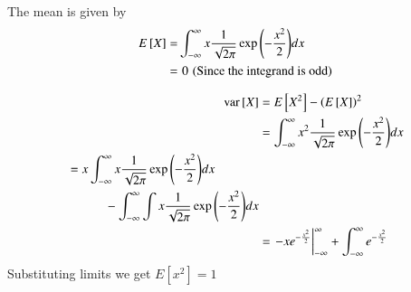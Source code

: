 \documentclass[journal,12pt,twocolumn]{IEEEtran}
\renewcommand\thesection{\arabic{section}}
\begin{document}
\begin{enumerate}[label=\thesection.\arabic*
,ref=\thesection.\theenumi]
\solution
The mean is given by
		\begin{align}
			E{}\left[X\right] =& \int_{-\infty}^{\infty}x\frac{1}{\sqrt{2\pi}}\exp{\ensuremath{\left(-\frac{x^2}{2}\right)}}dx\\
			=& \,\,0\,\,\text{(Since the integrand is odd)}
		\end{align}

		\begin{align}
			\text{var}{}\left[X\right] &= E{}\left[X^2\right] - \left(E{}\left[X\right]\right)^2 \\
			&=\int_{-\infty}^{\infty}x^2\frac{1}{\sqrt{2\pi}}\exp{\left(-\frac{x^2}{2}\right)}dx\\
			\begin{split}
			 &= x\int_{-\infty}^{\infty}x\frac{1}{\sqrt{2\pi}}\exp{\left(-\frac{x^2}{2}\right)}dx \\&\hspace{3em} -\int_{-\infty}^{\infty}\int x\frac{1}{\sqrt{2\pi}} \exp{\left(-\frac{x^2}{2}\right)}dx
			\end{split}\\
			&= \left.-xe^{-\frac{x^2}{2}}\right|_{-\infty}^{\infty} + \int_{-\infty}^{\infty} e^{-\frac{x^2}{2}}\\
		\end{align}
Substituting limits we get $E[x^2] = 1$


\end{enumerate}
\end{document}
